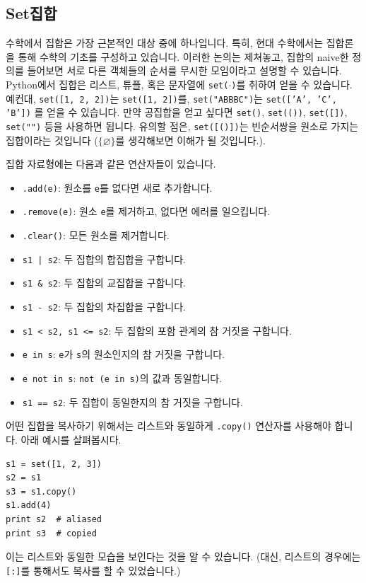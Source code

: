 \documentclass[../main.tex]{subfiles}
\begin{document}
\subsection{Set집합}
수학에서 집합은 가장 근본적인 대상 중에 하나입니다.
특히, 현대 수학에서는 집합론을 통해 수학의 기초를 구성하고 있습니다.
이러한 논의는 제쳐놓고, 집합의 naive한 정의를 들어보면 서로 다른 객체들의 순서를 무시한 모임이라고 설명할 수 있습니다.
Python에서 집합은 리스트, 튜플, 혹은 문자열에 \texttt{set($\cdot$)}를 취하여 얻을 수 있습니다.
예컨대, \texttt{set([1, 2, 2])}는 \texttt{set([1, 2])}를, \texttt{set("ABBBC")}는 \texttt{set(['A', 'C', 'B'])} 를 얻을 수 있습니다.
만약 공집합을 얻고 싶다면 \texttt{set()}, \texttt{set(())}, \texttt{set([])}, \texttt{set("")} 등을 사용하면 됩니다.
유의할 점은, \texttt{set([()])}는 빈순서쌍을 원소로 가지는 집합이라는 것입니다 ($\{\varnothing\}$를 생각해보면 이해가 될 것입니다.).

집합 자료형에는 다음과 같은 연산자들이 있습니다.
\begin{itemize}
    \item \texttt{.add(e)}: 원소를 \texttt{e}를 없다면 새로 추가합니다.
    \item \texttt{.remove(e)}: 원소 \texttt{e}를 제거하고, 없다면 에러를 일으킵니다.
    \item \texttt{.clear()}: 모든 원소를 제거합니다.
    \item \texttt{s1 | s2}: 두 집합의 합집합을 구합니다.
    \item \texttt{s1 \& s2}: 두 집합의 교집합을 구합니다.
    \item \texttt{s1 - s2}: 두 집합의 차집합을 구합니다.
    \item \texttt{s1 < s2, s1 <= s2}: 두 집합의 포함 관계의 참 거짓을 구합니다.
    \item \texttt{e in s}: \texttt{e}가 \texttt{s}의 원소인지의 참 거짓을 구합니다.
    \item \texttt{e not in s}: \texttt{not (e in s)}의 값과 동일합니다.
    \item \texttt{s1 == s2}: 두 집합이 동일한지의 참 거짓을 구합니다.
\end{itemize}

어떤 집합을 복사하기 위해서는 리스트와 동일하게 \texttt{.copy()} 연산자를 사용해야 합니다.
아래 예시를 살펴봅시다.
\begin{verbatim}
s1 = set([1, 2, 3])
s2 = s1
s3 = s1.copy()
s1.add(4)
print s2  # aliased
print s3  # copied
\end{verbatim}
이는 리스트와 동일한 모습을 보인다는 것을 알 수 있습니다.
(대신, 리스트의 경우에는 \texttt{[:]}를 통해서도 복사를 할 수 있었습니다.)
\end{document}
